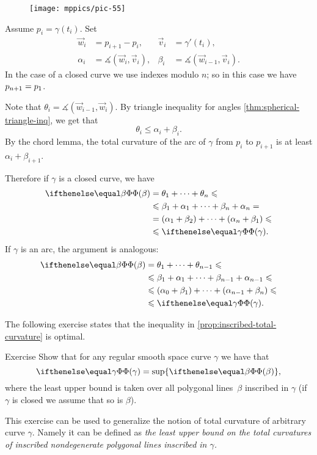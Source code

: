 \begin{wrapfigure}{o}{40 mm}
\vskip-0mm
\centering
\texttt{[image: mppics/pic-55]}
\vskip0mm
\end{wrapfigure}

Assume $p_i=\gamma(t_i)$.
Set 
\begin{align*}
\vec w_i&=p_{i+1}-p_i,& \vec v_i&=\gamma'(t_i),
\\
\alpha_i&=\measuredangle(\vec w_i,\vec v_i),&\beta_i&=\measuredangle(\vec w_{i-1},\vec v_i).
\end{align*}
In the case of a closed curve we use indexes modulo $n$;
so in this case we have $p_{n+1}\z=p_1$.

Note that $\theta_i=\measuredangle(\vec w_{i-1},\vec w_i)$.
By triangle inequality for angles \ref{thm:spherical-triangle-inq}, we get that
\[\theta_i\le \alpha_i+\beta_i.\]
By the chord lemma, the total curvature of the arc of $\gamma$ from $p_i$ to $p_{i+1}$ is at least $\alpha_i+\beta_{i+1}$. 

Therefore if $\gamma$ is a closed curve, we have
\begin{align*}
\tc{\beta}&=\theta_1+\dots+\theta_n\le 
\\
&\le\beta_1+\alpha_1+\dots+\beta_n+\alpha_n = 
\\
&=(\alpha_1+\beta_2)+\dots+(\alpha_n+\beta_1) \le 
\\
&\le \tc\gamma.
\end{align*}
If $\gamma$ is an arc, the argument is analogous:
\begin{align*}
\tc{\beta}&=\theta_1+\dots+\theta_{n-1}\le 
\\
&\le\beta_1+\alpha_1+\dots+\beta_{n-1}+\alpha_{n-1} \le
\\
&\le (\alpha_0+\beta_1)+\dots+(\alpha_{n-1}+\beta_n) \le 
\\
&\le \tc\gamma.
\end{align*}
\qedsf

The following exercise states that the inequality in \ref{prop:inscribed-total-curvature} is optimal.

\begin{thm}{Exercise}\label{ex:total-curvature=}
Show that for any regular smooth space curve $\gamma$ we have that 
\[\tc\gamma=\sup\{\tc\beta\},\]
where the least upper bound is taken over all polygonal lines~$\beta$ inscribed in $\gamma$
(if $\gamma$ is closed we assume that so is $\beta$).
\end{thm}

This exercise can be used to generalize the notion of total curvature of arbitrary curve $\gamma$.
Namely it can be defined as \emph{the least upper bound on the total curvatures of inscribed nondegenerate polygonal lines inscribed in $\gamma$.}

